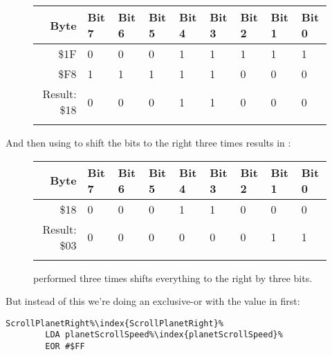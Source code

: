 \begin{figure}[H]
  {
    \setlength{\tabcolsep}{3.0pt}
    \setlength\cmidrulewidth{\heavyrulewidth} %
    \begin{adjustbox}{width=6cm,center}

      \begin{tabular}{rllllllll}
        \toprule
        Byte & Bit 7 & Bit 6 & Bit 5 & Bit 4 & Bit 3 & Bit 2 & Bit 1 & Bit 0        \\
        \midrule
        \$1F & 0 & 0 & 0 & 1 & 1 & 1 & 1 & 1 \\
        \$F8 & 1 & 1 & 1 & 1 & 1 & 0 & 0 & 0 \\
        \midrule
        Result: \$18 & 0 & 0 & 0 & 1 & 1 & 0 & 0 & 0 \\
        \addlinespace
        \bottomrule
      \end{tabular}
    \end{adjustbox}
  }
\end{figure}

And then using  to shift the bits to the right three times results in :

\begin{figure}[H]
  {
    \setlength{\tabcolsep}{3.0pt}
    \setlength\cmidrulewidth{\heavyrulewidth} %
    \begin{adjustbox}{width=6cm,center}

      \begin{tabular}{rllllllll}
        \toprule
        Byte & Bit 7 & Bit 6 & Bit 5 & Bit 4 & Bit 3 & Bit 2 & Bit 1 & Bit 0        \\
        \midrule
        \$18 & 0 & 0 & 0 & 1 & 1 & 0 & 0 & 0 \\
        \midrule
        Result: \$03 & 0 & 0 & 0 & 0 & 0 & 0 & 1 & 1 \\
        \addlinespace
        \bottomrule
      \end{tabular}
    \end{adjustbox}
  }\caption{ performed three times shifts everything to the right by three bits.}
\end{figure}

But instead of this we're doing an exclusive-or with the value in  first:

\begin{lstlisting}[escapechar=\%]
ScrollPlanetRight%\index{ScrollPlanetRight}%   
        LDA planetScrollSpeed%\index{planetScrollSpeed}%
        EOR #$FF
\end{lstlisting}

